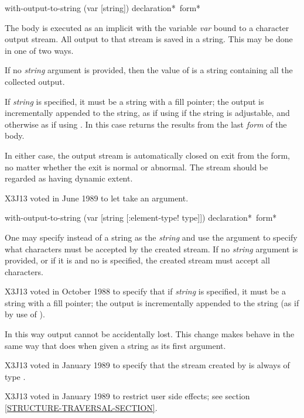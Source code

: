 \begin{obsolete}
\begin{defmac}
with-output-to-string (var [string]) {declaration}* {\,form}*

The body is executed as an implicit  with the variable {\it var}
bound to a character output stream.  All output to that stream
is saved in a string.  This may be done in one of two ways.

If no {\it string} argument is provided, then
the value of
 is a string containing all the collected output.

If {\it string} is specified, it must be a string with a fill pointer;
the output is incrementally appended to the string,
as if using  if the string is adjustable,
and otherwise as if using .
In this case 
returns the results from the last {\it form} of the body.

In either case,
the output stream is automatically closed on exit from
the  form,
no matter whether the exit is normal or abnormal.
The stream should be regarded as having dynamic extent.
\end{defmac}
\end{obsolete}

\begin{newer}
X3J13 voted in June 1989 
to let  take an  argument.

\begin{defmac}
with-output-to-string (var [string [\!:element-type! type]])
                      {declaration}* {\,form}*

One may specify  instead of a string as the {\it string}
and use the  argument to specify what characters
must be accepted by the created stream.  If no {\it string} argument
is provided, or if it is  and no  is specified,
the created stream must accept all characters.

X3J13 voted in October 1988
to specify that
if {\it string} is specified, it must be a string with a fill pointer;
the output is incrementally appended to the string (as if by use of
).

In this way output cannot be accidentally lost.  This change makes
 behave in the same way that  does
when given a string as its first argument.

X3J13 voted in January 1989
to specify that the stream created by
 is always of type .

X3J13 voted in January 1989
to restrict user side effects; see section \ref{STRUCTURE-TRAVERSAL-SECTION}.
\end{defmac}
\end{newer}

